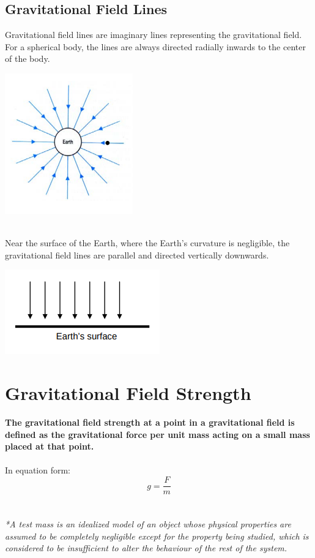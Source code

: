 \documentclass{article}
\begin{document}
\subsection{Gravitational Field Lines}

Gravitational field lines are imaginary lines representing the gravitational field. For a spherical body, the lines are always directed radially inwards to the center of the body.
\begin{center}
    \includegraphics[scale=0.6]{assets/radialLines.png}
\end{center}\leavevmode
\\Near the surface of the Earth, where the Earth's curvature is negligible, the gravitational field lines are parallel and directed vertically downwards.
\begin{center}
    \includegraphics[scale=0.6]{assets/surfaceLInes.png}
\end{center}\leavevmode
\pagebreak
\section{Gravitational Field Strength}
\textbf{The gravitational field strength at a point in a gravitational field is defined as the gravitational force per unit mass acting on a small mass placed at that point.}
\\
\\In equation form:
\begin{equation}
    g=\frac{F}{m}
\end{equation}
\\
\\\textit{\small{*A test mass is an idealized model of an object whose physical properties are assumed to be completely negligible except for the property being studied, which is considered to be insufficient to alter the behaviour of the rest of the system.}}
\end{document}
